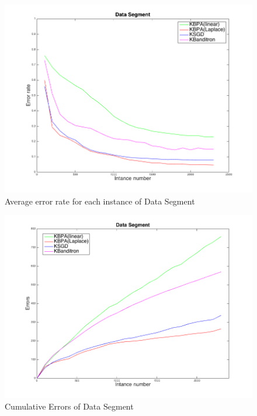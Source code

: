 \documentclass[twocolumn]{article}
\begin{document}
\begin{figure}[h!]
	\centerline{
		\includegraphics[width=\linewidth]{figs/Segment_kernel_M.png}}
	\caption{Average error rate for each instance of Data Segment}
	\label{pic:SKM}
\end{figure}

\begin{figure}[h!]
	\centerline{
		\includegraphics[width=\linewidth]{figs/Segment_kernel_CM.png}}
	\caption{Cumulative Errors of Data Segment}
	\label{pic:SKCM}
\end{figure}

\end{document}
